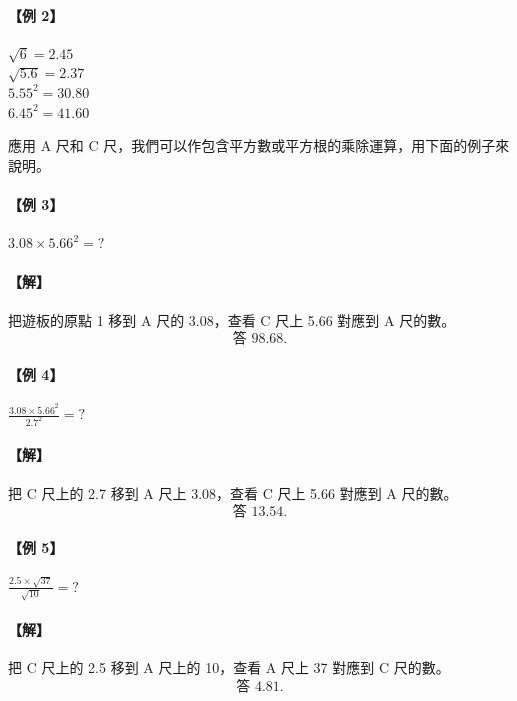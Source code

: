 \paragraph{【例 2】}
$\sqrt{6} = 2.45$ \\
$\sqrt{5.6} = 2.37$ \\
$5.55^2 = 30.80$ \\
$6.45^2 = 41.60$

應用 A 尺和 C 尺，我們可以作包含平方數或平方根的乘除運算，用下面的例子來說明。

\paragraph{【例 3】} $3.08 \times 5.66^2 = ?$

\paragraph{【解】}
把遊板的原點 1 移到 A 尺的 3.08，查看 C 尺上 5.66 對應到 A 尺的數。
\[
\text{答 } 98.68.
\]

\paragraph{【例 4】} $\frac{3.08 \times 5.66^2}{2.7^2} = ?$

\paragraph{【解】}
把 C 尺上的 2.7 移到 A 尺上 3.08，查看 C 尺上 5.66 對應到 A 尺的數。
\[
\text{答 } 13.54.
\]

\paragraph{【例 5】} $\frac{2.5 \times \sqrt{37}}{\sqrt{10}} = ?$

\paragraph{【解】}
把 C 尺上的 2.5 移到 A 尺上的 10，查看 A 尺上 37 對應到 C 尺的數。
\[
\text{答 } 4.81.
\]


